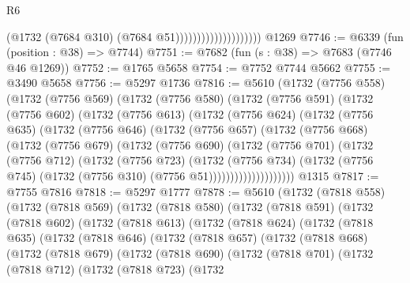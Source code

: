 \begin{lexlean}{R6}
\begin{coremodule}
                                        (@1732 (@7684 @310) (@7684 @51))))))))))))))))))))
    @1269
@7746 := @6339 (fun (position : @38) => @7744)
@7751 := @7682 (fun (s : @38) => @7683 (@7746 @46 @1269))
@7752 := @1765 @5658
@7754 := @7752 @7744 @5662
@7755 := @3490 @5658
@7756 := @5297 @1736
@7816 := @5610
    (@1732
      (@7756 @558)
      (@1732
        (@7756 @569)
        (@1732
          (@7756 @580)
          (@1732
            (@7756 @591)
            (@1732
              (@7756 @602)
              (@1732
                (@7756 @613)
                (@1732
                  (@7756 @624)
                  (@1732
                    (@7756 @635)
                    (@1732
                      (@7756 @646)
                      (@1732
                        (@7756 @657)
                        (@1732
                          (@7756 @668)
                          (@1732
                            (@7756 @679)
                            (@1732
                              (@7756 @690)
                              (@1732
                                (@7756 @701)
                                (@1732
                                  (@7756 @712)
                                  (@1732
                                    (@7756 @723)
                                    (@1732
                                      (@7756 @734)
                                      (@1732
                                        (@7756 @745)
                                        (@1732 (@7756 @310) (@7756 @51))))))))))))))))))))
    @1315
@7817 := @7755 @7816
@7818 := @5297 @1777
@7878 := @5610
    (@1732
      (@7818 @558)
      (@1732
        (@7818 @569)
        (@1732
          (@7818 @580)
          (@1732
            (@7818 @591)
            (@1732
              (@7818 @602)
              (@1732
                (@7818 @613)
                (@1732
                  (@7818 @624)
                  (@1732
                    (@7818 @635)
                    (@1732
                      (@7818 @646)
                      (@1732
                        (@7818 @657)
                        (@1732
                          (@7818 @668)
                          (@1732
                            (@7818 @679)
                            (@1732
                              (@7818 @690)
                              (@1732
                                (@7818 @701)
                                (@1732
                                  (@7818 @712)
                                  (@1732
                                    (@7818 @723)
                                    (@1732

\end{coremodule}
\end{lexlean}
